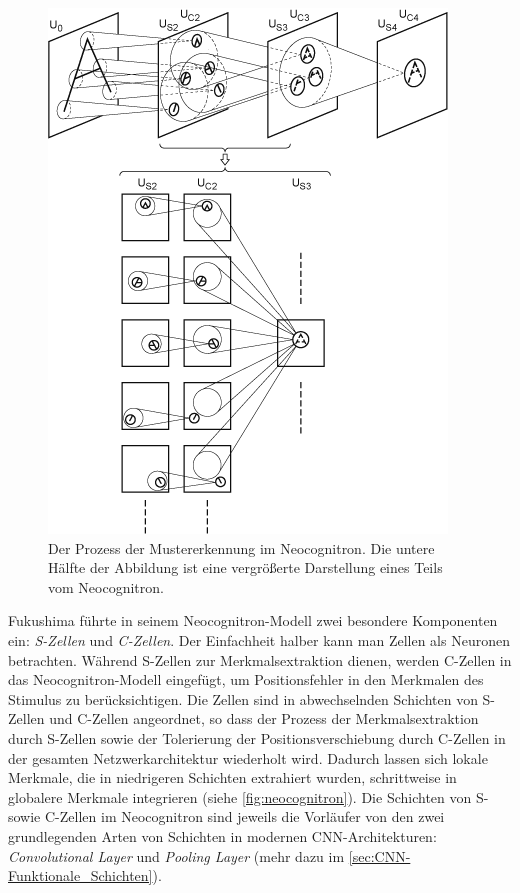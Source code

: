 \begin{description}
	\begin{figure}[!hb]
		\centering
		\includegraphics[width=0.72\linewidth]{images/Neocognitron}
		\caption{Der Prozess der Mustererkennung im Neocognitron. Die untere Hälfte der Abbildung ist eine vergrößerte Darstellung eines Teils vom Neocognitron. \protect\cite{neocognitron:scholarpediafig2}}
		\label{fig:neocognitron}
	\end{figure}

	Fukushima führte in seinem Neocognitron-Modell zwei besondere Komponenten ein: \emph{S-Zellen} und \emph{C-Zellen}. Der Einfachheit halber kann man Zellen als Neuronen betrachten. Während S-Zellen zur Merkmalsextraktion dienen, werden C-Zellen in das Neocognitron-Modell eingefügt, um Positionsfehler in den Merkmalen des Stimulus zu berücksichtigen. Die Zellen sind in abwechselnden Schichten von S-Zellen und C-Zellen angeordnet, so dass der Prozess der Merkmalsextraktion durch S-Zellen sowie der Tolerierung der Positionsverschiebung durch C-Zellen in der gesamten Netzwerkarchitektur wiederholt wird. Dadurch lassen sich lokale Merkmale, die in niedrigeren Schichten extrahiert wurden, schrittweise in globalere Merkmale integrieren (siehe \autoref{fig:neocognitron}). Die Schichten von S- sowie C-Zellen im Neocognitron sind jeweils die Vorläufer von den zwei grundlegenden Arten von Schichten in modernen CNN-Architekturen: \emph{Convolutional Layer} und \emph{Pooling Layer} (mehr dazu im \autoref{sec:CNN-Funktionale_Schichten}).
	

\end{description}
